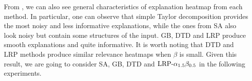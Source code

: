From \addfigure{\ref{fig:lenet_heatmaps}}, we can also see general characteristics of explanation heatmap from each method. In particular, one can observe that simple Taylor decomposition provides the most noisy and less informative explanations, while the ones from SA also look noisy but contain some structures of the input. GB, DTD and LRP produce smooth explanations and quite informative. It is worth noting that DTD and LRP methods produce similar relevance heatmaps when $\beta$ is small. Given this result, we are going to consider SA, GB, DTD and $\text{LRP-}\alpha_{1.5}\beta_{0.5}$ in the following experiments.